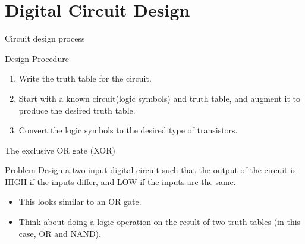 \section{Digital Circuit Design}

\begin{frame}{Circuit design process}
  \begin{block}{Design Procedure}
    \begin{enumerate}
      \item Write the truth table for the circuit.
      \item Start with a known circuit(logic symbols) and truth table, and augment it to produce the desired truth table.
      \item Convert the logic symbols to the desired type of transistors.
    \end{enumerate}
  \end{block}
\end{frame}

\begin{frame}{The exclusive OR gate (XOR)}
  \begin{block}{Problem}
    Design a two input digital circuit such that the output of the circuit is HIGH if the inputs differ, and LOW if the inputs are the same.
  \end{block}
\end{frame}

\begin{itemize}
  \item This looks similar to an OR gate.
  \item Think about doing a logic operation on the result of two truth tables (in this case, OR and NAND).
\end{itemize}

